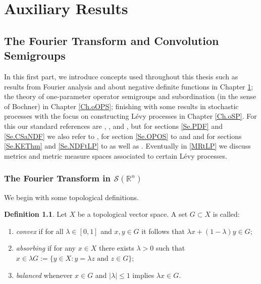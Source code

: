 \documentclass[a4paper, 12pt]{report}
\theoremstyle{remark}
\theoremstyle{definition}
\newtheorem{definition}[theorem]{Definition}
\begin{document}
\newpage\null

\part{Auxiliary Results}

\newpage\null

\chapter{The Fourier Transform and Convolution Semigroups}\label{Ch.oTFTaCS}

In this first part, we introduce concepts used throughout this thesis such as results from Fourier analysis and about negative definite functions in Chapter \ref{Ch.oTFTaCS}; the theory of one-parameter operator semigroups and subordination (in the sense of Bochner) in Chapter \ref{Ch.oOPS}; finishing with some results in stochastic processes with the focus on constructing L\'evy processes in Chapter \ref{Ch.oSP}.  For this our standard references are \cite{Vol1}, \cite{Vol2}, \cite{Vol3} and \cite{Bernstein}, but for sections \ref{Se.PDF} and \ref{Se.CSaNDF} we also refer to \cite{I.25}, for section \ref{Se.OPOS} to \cite{I.235} and \cite{Tanabe} and for sections \ref{Se.KEThm} and \ref{Se.NDFtLP} to \cite{SPRef} as well as \cite{Sato}.  Eventually in \ref{MRtLP} we discuss metrics and metric measure spaces associated to certain L\'evy processes.

\section{The Fourier Transform in $\mathcal{S}(\mathbb{R}^n)$}\label{TFTiSS}

We begin with some topological definitions.

\begin{definition}
Let $X$ be a topological vector space.  A set $G \subset X$ is called:
\begin{enumerate}
\item \emph{convex} if for all $\lambda \in [0, 1]$ and $x, y \in G$ it follows that $\lambda x + (1 - \lambda)y \in G$;

\item \emph{absorbing} if for any $x \in X$ there exists $\lambda > 0$ such that $x \in \lambda G := \{y \in X : y = \lambda z \text{ and } z \in G\}$;

\item \emph{balanced} whenever $x \in G$ and $|\lambda| \le 1$ implies $\lambda x \in G$.
\end{enumerate}
\end{definition}
\end{document}
